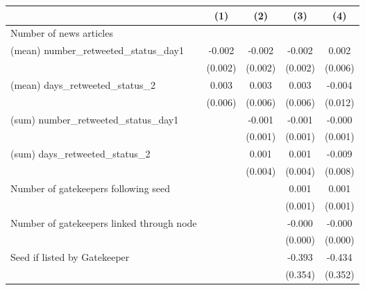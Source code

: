 {
\def\sym#1{\ifmmode^{#1}\else\(^{#1}\)\fi}
\begin{tabular}{l*{4}{c}}
\hline\hline
                    &\multicolumn{1}{c}{(1)}         &\multicolumn{1}{c}{(2)}         &\multicolumn{1}{c}{(3)}         &\multicolumn{1}{c}{(4)}         \\
\hline
Number of news articles&                     &                     &                     &                     \\
(mean) number\_retweeted\_status\_day1&      -0.002         &      -0.002         &      -0.002         &       0.002         \\
                    &     (0.002)         &     (0.002)         &     (0.002)         &     (0.006)         \\
(mean) days\_retweeted\_status\_2&       0.003         &       0.003         &       0.003         &      -0.004         \\
                    &     (0.006)         &     (0.006)         &     (0.006)         &     (0.012)         \\
(sum) number\_retweeted\_status\_day1&                     &      -0.001         &      -0.001         &      -0.000         \\
                    &                     &     (0.001)         &     (0.001)         &     (0.001)         \\
(sum) days\_retweeted\_status\_2&                     &       0.001         &       0.001         &      -0.009         \\
                    &                     &     (0.004)         &     (0.004)         &     (0.008)         \\
Number of gatekeepers following seed&                     &                     &       0.001         &       0.001         \\
                    &                     &                     &     (0.001)         &     (0.001)         \\
Number of gatekeepers linked through node&                     &                     &      -0.000         &      -0.000         \\
                    &                     &                     &     (0.000)         &     (0.000)         \\
Seed if listed by Gatekeeper&                     &                     &      -0.393         &      -0.434         \\
                    &                     &                     &     (0.354)         &     (0.352)         \\

\end{tabular}}

